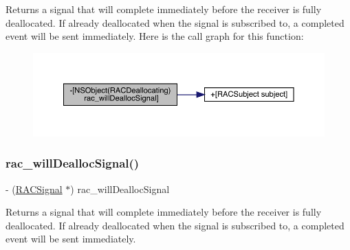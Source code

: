 Returns a signal that will complete immediately before the receiver is fully deallocated. If already deallocated when the signal is subscribed to, a {\ttfamily completed} event will be sent immediately. Here is the call graph for this function\+:\nopagebreak
\begin{figure}[H]
\begin{center}
\leavevmode
\includegraphics[width=350pt]{category_n_s_object_07_r_a_c_deallocating_08_a5a203df4b4af42221797e447090819c7_cgraph}
\end{center}
\end{figure}
\mbox{\label{category_n_s_object_07_r_a_c_deallocating_08_a5a203df4b4af42221797e447090819c7}} 
\subsubsection{\texorpdfstring{rac\+\_\+will\+Dealloc\+Signal()}{rac\_willDeallocSignal()}\hspace{0.1cm}{\footnotesize\ttfamily [2/3]}}
{\footnotesize\ttfamily -\/ (\mbox{\hyperlink{interface_r_a_c_signal}{R\+A\+C\+Signal}} $\ast$) rac\+\_\+will\+Dealloc\+Signal \begin{DoxyParamCaption}{ }\end{DoxyParamCaption}}

Returns a signal that will complete immediately before the receiver is fully deallocated. If already deallocated when the signal is subscribed to, a {\ttfamily completed} event will be sent immediately. \mbox{\label{category_n_s_object_07_r_a_c_deallocating_08_a5a203df4b4af42221797e447090819c7}} 

